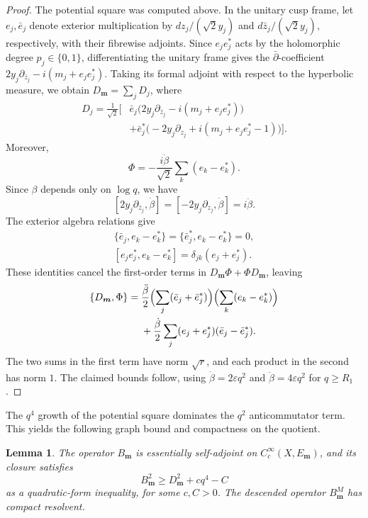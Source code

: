 \documentclass[11pt]{article}
\theoremstyle{definition}
\theoremstyle{plain}
\numberwithin{equation}{section}
\newtheorem{lemma}[theorem]{Lemma}
\begin{document}
\begin{proof}
The potential square was computed above. In the unitary
cusp frame, let $e_j,\bar e_j$ denote exterior multiplication
by $dz_j/(\sqrt2 y_j)$ and $d\bar z_j/(\sqrt2 y_j)$,
respectively, with their fibrewise adjoints.
Since $e_je_j^*$ acts by the holomorphic degree
$p_j\in\{0,1\}$, differentiating the unitary frame gives
the $\bar\partial$-coefficient
$2y_j\partial_{\bar z_j}-i(m_j+e_je_j^*)$.
Taking its formal adjoint with respect to the hyperbolic
measure, we obtain $D_{\boldsymbol m}=\sum_jD_j$, where
\[
\begin{aligned}
D_j=\frac1{\sqrt2}\Big[
 &\bar e_j\bigl(2y_j\partial_{\bar z_j}
                -i(m_j+e_je_j^*)\bigr)\\
 &+\bar e_j^*\bigl(-2y_j\partial_{z_j}
                +i(m_j+e_je_j^*-1)\bigr)
\Big].
\end{aligned}
\]
Moreover,
\[
 \Phi=-\frac{i\dot\beta}{\sqrt2}
          \sum_k(e_k-e_k^*).
\]
Since $\beta$ depends only on $\log q$, we have
\[
 [2y_j\partial_{\bar z_j},\dot\beta]
 =[-2y_j\partial_{z_j},\dot\beta]
 =i\ddot\beta.
\]
The exterior algebra relations give
\[
\begin{gathered}
 \{\bar e_j,e_k-e_k^*\}
 =\{\bar e_j^*,e_k-e_k^*\}=0,\\
 [e_je_j^*,e_k-e_k^*]
 =\delta_{jk}(e_j+e_j^*).
\end{gathered}
\]
These identities cancel the first-order terms in
$D_{\boldsymbol m}\Phi+\Phi D_{\boldsymbol m}$, leaving
\[
\begin{aligned}
\{D_{\boldsymbol m},\Phi\}
={}&\frac{\ddot\beta}{2}
 \Bigl(\sum_j(\bar e_j+\bar e_j^*)\Bigr)
 \Bigl(\sum_k(e_k-e_k^*)\Bigr)\\
 &+\frac{\dot\beta}{2}
 \sum_j(e_j+e_j^*)(\bar e_j-\bar e_j^*).
\end{aligned}
\]
The two sums in the first term have norm $\sqrt r$,
and each product in the second has norm $1$.
The claimed bounds follow, using
$\dot\beta=2\varepsilon q^2$ and
$\ddot\beta=4\varepsilon q^2$ for $q\geq R_1$.
\end{proof}


The $q^4$ growth of the potential square dominates the $q^2$
anticommutator term.  This yields the following graph bound and
compactness on the quotient.

\begin{lemma}\label{lem:coercivity}
The operator $B_{\boldsymbol m}$ is essentially self-adjoint on
$C_c^\infty(X,E_{\boldsymbol m})$, and its closure satisfies
\begin{equation}\label{eq:coercive}
 B_{\boldsymbol m}^2\geq D_{\boldsymbol m}^2+cq^4-C
\end{equation}
as a quadratic-form inequality, for some $c,C>0$.
The descended operator $B_{\boldsymbol m}^M$ has compact resolvent.
\end{lemma}
\end{document}
